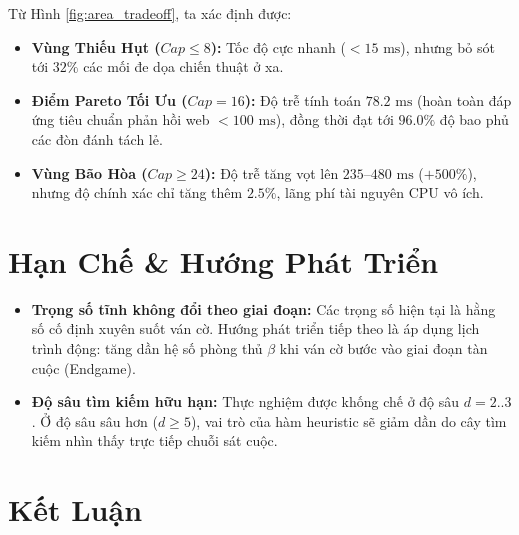 \documentclass[11pt,a4paper]{article}
\begin{document}
Từ Hình \ref{fig:area_tradeoff}, ta xác định được:
\begin{itemize}
    \item \textbf{Vùng Thiếu Hụt ($Cap \le 8$):} Tốc độ cực nhanh ($< 15\text{ ms}$), nhưng bỏ sót tới $32\%$ các mối đe dọa chiến thuật ở xa.
    \item \textbf{Điểm Pareto Tối Ưu ($Cap = 16$):} Độ trễ tính toán $78.2\text{ ms}$ (hoàn toàn đáp ứng tiêu chuẩn phản hồi web $< 100\text{ ms}$), đồng thời đạt tới $96.0\%$ độ bao phủ các đòn đánh tách lẻ.
    \item \textbf{Vùng Bão Hòa ($Cap \ge 24$):} Độ trễ tăng vọt lên $235\text{--}480\text{ ms}$ ($+500\%$), nhưng độ chính xác chỉ tăng thêm $2.5\%$, lãng phí tài nguyên CPU vô ích.
\end{itemize}

\FloatBarrier
\section{Hạn Chế \& Hướng Phát Triển}

\begin{itemize}
    \item \textbf{Trọng số tĩnh không đổi theo giai đoạn:} Các trọng số hiện tại là hằng số cố định xuyên suốt ván cờ. Hướng phát triển tiếp theo là áp dụng lịch trình động: tăng dần hệ số phòng thủ $\beta$ khi ván cờ bước vào giai đoạn tàn cuộc (Endgame).
    \item \textbf{Độ sâu tìm kiếm hữu hạn:} Thực nghiệm được khống chế ở độ sâu $d = 2..3$. Ở độ sâu sâu hơn ($d \ge 5$), vai trò của hàm heuristic sẽ giảm dần do cây tìm kiếm nhìn thấy trực tiếp chuỗi sát cuộc.
\end{itemize}

\section{Kết Luận}
\end{document}
